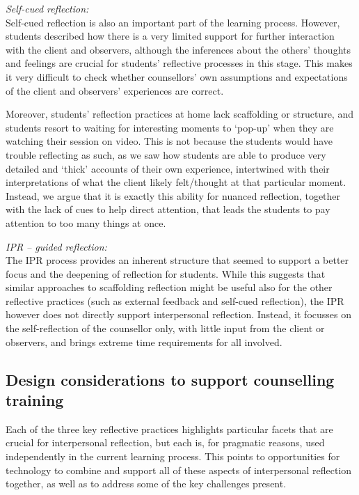 \documentclass{sigchi}
\begin{document}
\enlargethispage{\baselineskip}
\emph{Self-cued reflection:}\\
Self-cued reflection is also an important part of the learning process. However, students described how there is a very limited support for further interaction with the client and observers, although the inferences about the others' thoughts and feelings are crucial for students' reflective processes in this stage. This makes it very difficult to check whether counsellors' own assumptions and expectations of the client and observers' experiences are correct. 

Moreover, students' reflection practices at home lack scaffolding or structure, and students resort to waiting for interesting moments to `pop-up' when they are watching their session on video. This is not because the students would have trouble reflecting as such, as we saw how students are able to produce very detailed and `thick' accounts of their own experience, intertwined with their interpretations of what the client likely felt/thought at that particular moment. Instead, we argue that it is exactly this ability for nuanced reflection, together with the lack of cues to help direct attention, that leads the students to pay attention to too many things at once.

\emph{IPR -- guided reflection:}\\
The IPR process provides an inherent structure that seemed to support a better focus and the deepening of reflection for students. While this suggests that similar approaches to scaffolding reflection might be useful also for the other reflective practices (such as external feedback and self-cued reflection), the IPR however does not directly support interpersonal reflection. Instead, it focusses on the self-reflection of the counsellor only, with little input from the client or observers, and brings extreme time requirements for all involved. 

\subsection{Design considerations to support counselling training}
Each of the three key reflective practices highlights particular facets that are crucial for interpersonal reflection, but each is, for pragmatic reasons, used independently in the current learning process. This points to opportunities for technology to combine and support all of these aspects of interpersonal reflection together, as well as to address some of the key challenges present. 
\end{document}
